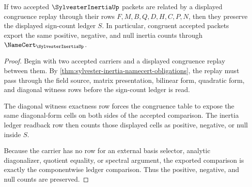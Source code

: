 \begin{theorem}
\label{thm:sylvester-inertia-congruence-invariance}
If two accepted $\SylvesterInertiaUp$ packets are related by a displayed congruence replay through their rows $F,M,B,Q,D,H,C,P,N$, then they preserve the displayed sign-count ledger $S$. In particular, congruent accepted packets export the same positive, negative, and null inertia counts through $\NameCert_{\SylvesterInertiaUp}$.
\end{theorem}
\begin{proof}
Begin with two accepted carriers and a displayed congruence replay between them. By \autoref{thm:sylvester-inertia-namecert-obligations}, the replay must pass through the field source, matrix presentation, bilinear form, quadratic form, and diagonal witness rows before the sign-count ledger is read.

The diagonal witness exactness row forces the congruence table to expose the same diagonal-form cells on both sides of the accepted comparison. The inertia ledger readback row then counts those displayed cells as positive, negative, or null inside $S$.

Because the carrier has no row for an external basis selector, analytic diagonalizer, quotient equality, or spectral argument, the exported comparison is exactly the componentwise ledger comparison. Thus the positive, negative, and null counts are preserved.
\end{proof}


\begin{closurestatus}{\SylvesterInertiaUp}
  \theoryclosure{\seedClosure}
  \formalstatus{\unformalizedV}
\end{closurestatus}
